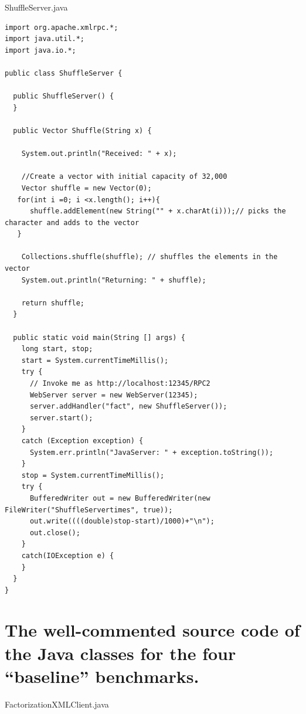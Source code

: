 \documentclass{article}
\begin{document}
ShuffleServer.java
\begin{lstlisting}
import org.apache.xmlrpc.*;
import java.util.*;
import java.io.*;

public class ShuffleServer {

  public ShuffleServer() {
  }

  public Vector Shuffle(String x) {

    System.out.println("Received: " + x);

    //Create a vector with initial capacity of 32,000
    Vector shuffle = new Vector(0);
   for(int i =0; i <x.length(); i++){
      shuffle.addElement(new String("" + x.charAt(i)));// picks the character and adds to the vector
   }
    
    Collections.shuffle(shuffle); // shuffles the elements in the vector
    System.out.println("Returning: " + shuffle);

    return shuffle;
  }

  public static void main(String [] args) {
    long start, stop;
    start = System.currentTimeMillis();
    try {
      // Invoke me as http://localhost:12345/RPC2
      WebServer server = new WebServer(12345);
      server.addHandler("fact", new ShuffleServer());
      server.start();
    }
    catch (Exception exception) {
      System.err.println("JavaServer: " + exception.toString());
    }
    stop = System.currentTimeMillis();
    try {
      BufferedWriter out = new BufferedWriter(new FileWriter("ShuffleServertimes", true));
      out.write((((double)stop-start)/1000)+"\n");
      out.close();
    }
    catch(IOException e) {
    }
  }
}
\end{lstlisting}


\section{The well-commented source code of the Java classes for the four ``baseline” benchmarks.}

FactorizationXMLClient.java
\end{document}
